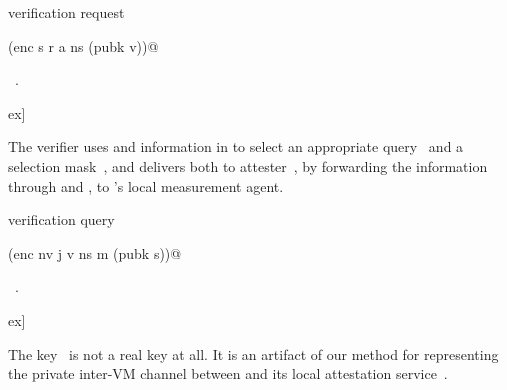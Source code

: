 \documentclass[titlepage,12pt]{article}
\theoremstyle{definition}
\begin{document}
\begin{flushleft} \small
\begin{minipage}{\linewidth} \label{scrap2}
verification request\nobreak\ {\footnotesize {}}
\vspace{-1ex}
\begin{list}{}{} \item
\mbox{}\verb@(enc s r a ns (pubk v))@{\NWsep}
\end{list}
\vspace{-1ex}
\footnotesize\addtolength{\baselineskip}{-1ex}
\begin{list}{}{\setlength{\itemsep}{-\parsep}\setlength{\itemindent}{-\leftmargin}}
\item \NWtxtMacroRefIn\ .
\end{list}
\end{minipage}\4ex]
\end{flushleft}
\item[]
The verifier uses  and information in  to select an appropriate
query~ and a selection mask~, and delivers both to attester~,
by forwarding the information through  and , to 's local
measurement agent.
\begin{flushleft} \small
\begin{minipage}{\linewidth} \label{scrap4}
verification query\nobreak\ {\footnotesize {}}
\vspace{-1ex}
\begin{list}{}{} \item
\mbox{}\verb@(enc nv j v ns m (pubk s))@{\NWsep}
\end{list}
\vspace{-1ex}
\footnotesize\addtolength{\baselineskip}{-1ex}
\begin{list}{}{\setlength{\itemsep}{-\parsep}\setlength{\itemindent}{-\leftmargin}}
\item \NWtxtMacroRefIn\ .
\end{list}
\end{minipage}\4ex]
\end{flushleft}
\item[]
The key~ is not a real key at all.  It is an artifact of
our method for representing the private inter-VM channel between 
and its local attestation service~.
\end{document}
